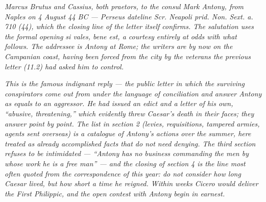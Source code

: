 
\textit{Marcus Brutus and Cassius, both praetors, to the
consul Mark Antony, from Naples on 4 August 44 BC --- Perseus
dateline \textit{Scr. Neapoli prid. Non. Sext. a. 710 (44)},
which the closing line of the letter itself confirms.
The salutation uses the formal opening \textit{si vales, bene
est}, a courtesy entirely at odds with what follows. The
addressee is Antony at Rome; the writers are by now on the
Campanian coast, having been forced from the city by the
veterans the previous letter (11.2) had asked him to control.}

\textit{This is the famous indignant reply --- the public
letter in which the surviving conspirators come out from
under the language of conciliation and answer Antony as
equals to an aggressor. He had issued an edict and a letter
of his own, ``abusive, threatening,'' which evidently threw
Caesar's death in their faces; they answer point by point.
The list in section 2 (levies, requisitions, tampered armies,
agents sent overseas) is a catalogue of Antony's actions over
the summer, here treated as already accomplished facts that
do not need denying. The third section refuses to be
intimidated --- ``Antony has no business commanding the men
by whose work he is a free man'' --- and the closing of
section 4 is the line most often quoted from the
correspondence of this year: do not consider how long Caesar
lived, but how short a time he reigned. Within weeks Cicero
would deliver the First Philippic, and the open contest with
Antony begin in earnest.}
